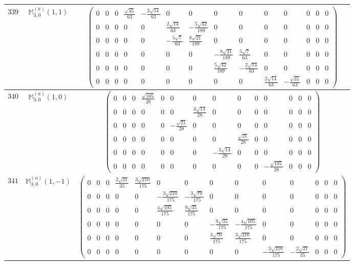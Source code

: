 \documentclass[fleqn,8pt,landscape]{jsarticle}
\begin{document}
\begin{center}
\begin{longtable}{ccc}
$ 339 $ & $ \mathbb{M}_{3,0}^{(a)}(1,1) $ & $ \begin{pmatrix} 0 & 0 & 0 & \frac{\sqrt{35}}{63} & - \frac{2 \sqrt{14}}{63} & 0 & 0 & 0 & 0 & 0 & 0 & 0 & 0 & 0 \\ 0 & 0 & 0 & 0 & 0 & \frac{2 \sqrt{14}}{63} & - \frac{5 \sqrt{42}}{189} & 0 & 0 & 0 & 0 & 0 & 0 & 0 \\ 0 & 0 & 0 & 0 & 0 & - \frac{5 \sqrt{7}}{63} & \frac{8 \sqrt{21}}{189} & 0 & 0 & 0 & 0 & 0 & 0 & 0 \\ 0 & 0 & 0 & 0 & 0 & 0 & 0 & - \frac{8 \sqrt{21}}{189} & \frac{5 \sqrt{7}}{63} & 0 & 0 & 0 & 0 & 0 \\ 0 & 0 & 0 & 0 & 0 & 0 & 0 & \frac{5 \sqrt{42}}{189} & - \frac{2 \sqrt{14}}{63} & 0 & 0 & 0 & 0 & 0 \\ 0 & 0 & 0 & 0 & 0 & 0 & 0 & 0 & 0 & \frac{2 \sqrt{14}}{63} & - \frac{\sqrt{35}}{63} & 0 & 0 & 0 \end{pmatrix} $ \\ \hline
$ 340 $ & $ \mathbb{M}_{3,0}^{(a)}(1,0) $ & $ \begin{pmatrix} 0 & 0 & 0 & \frac{\sqrt{105}}{28} & 0 & 0 & 0 & 0 & 0 & 0 & 0 & 0 & 0 & 0 \\ 0 & 0 & 0 & 0 & 0 & 0 & \frac{3 \sqrt{14}}{28} & 0 & 0 & 0 & 0 & 0 & 0 & 0 \\ 0 & 0 & 0 & 0 & 0 & - \frac{\sqrt{21}}{28} & 0 & 0 & 0 & 0 & 0 & 0 & 0 & 0 \\ 0 & 0 & 0 & 0 & 0 & 0 & 0 & 0 & \frac{\sqrt{21}}{28} & 0 & 0 & 0 & 0 & 0 \\ 0 & 0 & 0 & 0 & 0 & 0 & 0 & - \frac{3 \sqrt{14}}{28} & 0 & 0 & 0 & 0 & 0 & 0 \\ 0 & 0 & 0 & 0 & 0 & 0 & 0 & 0 & 0 & 0 & - \frac{\sqrt{105}}{28} & 0 & 0 & 0 \end{pmatrix} $ \\ \hline
$ 341 $ & $ \mathbb{M}_{3,0}^{(a)}(1,-1) $ & $ \begin{pmatrix} 0 & 0 & 0 & \frac{2 \sqrt{21}}{35} & \frac{3 \sqrt{210}}{175} & 0 & 0 & 0 & 0 & 0 & 0 & 0 & 0 & 0 \\ 0 & 0 & 0 & 0 & 0 & - \frac{3 \sqrt{210}}{175} & - \frac{3 \sqrt{70}}{175} & 0 & 0 & 0 & 0 & 0 & 0 & 0 \\ 0 & 0 & 0 & 0 & 0 & \frac{4 \sqrt{105}}{175} & \frac{9 \sqrt{35}}{175} & 0 & 0 & 0 & 0 & 0 & 0 & 0 \\ 0 & 0 & 0 & 0 & 0 & 0 & 0 & - \frac{9 \sqrt{35}}{175} & - \frac{4 \sqrt{105}}{175} & 0 & 0 & 0 & 0 & 0 \\ 0 & 0 & 0 & 0 & 0 & 0 & 0 & \frac{3 \sqrt{70}}{175} & \frac{3 \sqrt{210}}{175} & 0 & 0 & 0 & 0 & 0 \\ 0 & 0 & 0 & 0 & 0 & 0 & 0 & 0 & 0 & - \frac{3 \sqrt{210}}{175} & - \frac{2 \sqrt{21}}{35} & 0 & 0 & 0 \end{pmatrix} $ \\ \hline

\end{longtable}
\end{center}
\end{document}
